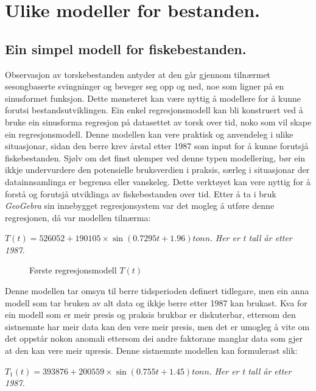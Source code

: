 \documentclass{report}
\begin{document}
\section{Ulike modeller for bestanden.}
\subsection{Ein simpel modell for fiskebestanden.}
Observasjon av torskebestanden antyder at den går gjennom tilnærmet sesongbaserte svingninger og beveger seg opp og ned, noe som ligner på en sinusformet funksjon. Dette mønsteret kan være nyttig å modellere for å kunne forutsi bestandsutviklingen.
Ein enkel regresjonsmodell kan bli konstruert ved å bruke ein sinusforma regresjon på datasettet av torsk over tid, noko som vil skape ein regresjonsmodell. Denne modellen kan vere praktisk og anvendeleg i ulike situasjonar, sidan den berre krev årstal etter 1987 som input for å kunne forutsjå fiskebestanden.
Sjølv om det finst ulemper ved denne typen modellering, bør ein ikkje undervurdere den potensielle bruksverdien i praksis, særleg i situasjonar der datainnsamlinga er begrensa eller vanskeleg. Dette verktøyet kan vere nyttig for å forstå og forutsjå utviklinga av fiskebestanden over tid.
\newline
Etter å ta i bruk \textit{GeoGebra} sin innebygget regresjonsystem var det mogleg å utføre denne regresjonen, då var modellen tilnærma:
\begin{center}
    $T(t) = 526052+190105\times \sin(0.7295t+1.96)tonn.$
    \textit{Her er t tall år etter 1987.}
\end{center}
\begin{figure}[H]
    \centering
    \caption{Første regresjonsmodell $T(t)$}
    \label{T}
\end{figure}
Denne modellen tar omsyn til berre tidsperioden definert tidlegare, men ein anna modell som tar bruken av alt data og ikkje berre etter 1987 kan brukast.
Kva for ein modell som er meir presis og praksis brukbar er diskuterbar, ettersom den sistnemnte har meir data kan den vere meir presis, men det er umogleg å vite om det oppstår nokon anomali ettersom dei andre faktorane manglar data som gjer at den kan vere meir upresis.
Denne sistnemnte modellen kan formulerast slik:
\begin{center}
    $T_{1}(t) = 393876+200559\times \sin(0.755t+1.45)tonn.$
    \textit{Her er t tall år etter 1987.}
\end{center}
\end{document}
